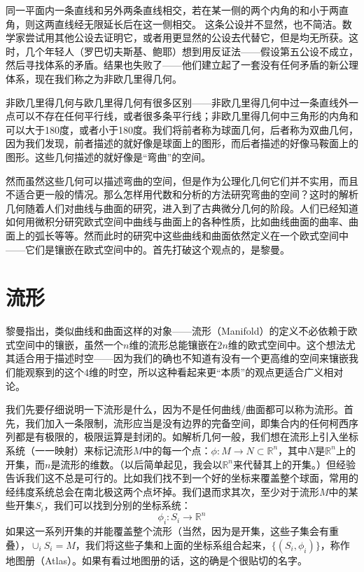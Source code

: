 \documentclass{ctexart}
\begin{document}
同一平面内一条直线和另外两条直线相交，若在某一侧的两个内角的和小于两直角，则这两直线经无限延长后在这一侧相交。
这条公设并不显然，也不简洁。数学家尝试用其他公设去证明它，或者用更显然的公设去代替它，但是均无所获。这时，几个年轻人（罗巴切夫斯基、鲍耶）想到用反证法——假设第五公设不成立，然后寻找体系的矛盾。结果也失败了——他们建立起了一套没有任何矛盾的新公理体系，现在我们称之为非欧几里得几何。

非欧几里得几何与欧几里得几何有很多区别——非欧几里得几何中过一条直线外一点可以不存在任何平行线，或者很多条平行线；非欧几里得几何中三角形的内角和可以大于180度，或者小于180度。我们将前者称为球面几何，后者称为双曲几何，因为我们发现，前者描述的就好像是球面上的图形，而后者描述的好像马鞍面上的图形。这些几何描述的就好像是“弯曲”的空间。

然而虽然这些几何可以描述弯曲的空间，但是作为公理化几何它们并不实用，而且不适合更一般的情况。那么怎样用代数和分析的方法研究弯曲的空间？这时的解析几何随着人们对曲线与曲面的研究，进入到了古典微分几何的阶段。人们已经知道如何用微积分研究欧式空间中曲线与曲面上的各种性质，比如曲线曲面的曲率、曲面上的弧长等等。然而此时的研究中这些曲线和曲面依然定义在一个欧式空间中——它们是镶嵌在欧式空间中的。首先打破这个观点的，是黎曼。

\section{流形}
黎曼指出，类似曲线和曲面这样的对象——流形（Manifold）的定义不必依赖于欧式空间中的镶嵌，虽然一个$n$维的流形总能镶嵌在$2n$维的欧式空间中。这个想法尤其适合用于描述时空——因为我们的确也不知道有没有一个更高维的空间来镶嵌我们能观察到的这个4维的时空，所以这种看起来更“本质”的观点更适合广义相对论。

我们先要仔细说明一下流形是什么，因为不是任何曲线/曲面都可以称为流形。首先，我们加入一条限制，流形应当是没有边界的完备空间，即集合内的任何柯西序列都是有极限的，极限运算是封闭的。如解析几何一般，我们想在流形上引入坐标系统（一一映射）来标记流形$M$中的每一个点：$\phi:M\to N\subset\mathbb{R}^n$，其中$N$是$\mathbb{R}^n$上的开集，而$n$是流形的维数。（以后简单起见，我会以$\mathbb{R}^n$来代替其上的开集。）但经验告诉我们这不总是可行的。比如我们找不到一个好的坐标来覆盖整个球面，常用的经纬度系统总会在南北极这两个点坏掉。我们退而求其次，至少对于流形$M$中的某些开集$S_i$，我们可以找到分别的坐标系统：
\begin{equation}
\phi_i:S_i\to\mathbb{R}^n
\end{equation}
如果这一系列开集的并能覆盖整个流形（当然，因为是开集，这些子集会有重叠），$\cup_i S_i=M$，我们将这些子集和上面的坐标系组合起来，$\{(S_i,\phi_i)\}$，称作地图册（Atlas）。如果有看过地图册的话，这的确是个很贴切的名字。
\end{document}
